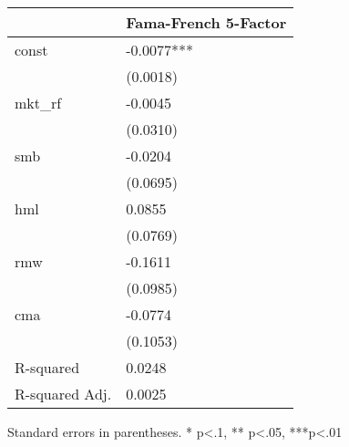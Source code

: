 \begin{table}
\caption{}
\label{}
\begin{center}
\begin{tabular}{ll}
\hline
               & Fama-French 5-Factor  \\
\hline
const          & -0.0077***            \\
               & (0.0018)              \\
mkt\_rf        & -0.0045               \\
               & (0.0310)              \\
smb            & -0.0204               \\
               & (0.0695)              \\
hml            & 0.0855                \\
               & (0.0769)              \\
rmw            & -0.1611               \\
               & (0.0985)              \\
cma            & -0.0774               \\
               & (0.1053)              \\
R-squared      & 0.0248                \\
R-squared Adj. & 0.0025                \\
\hline
\end{tabular}
\end{center}
\end{table}
\bigskip
Standard errors in parentheses. \newline 
* p<.1, ** p<.05, ***p<.01